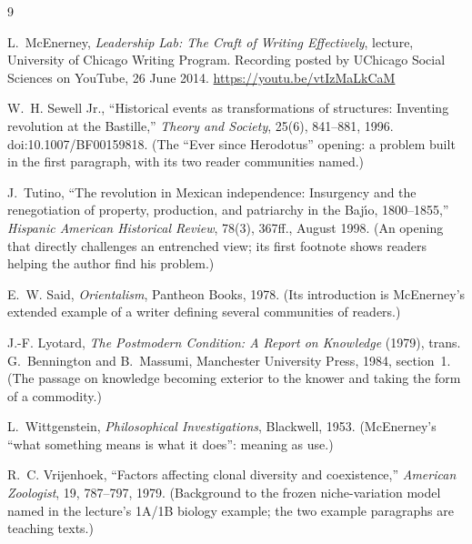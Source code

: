 \documentclass[11pt]{article}
\begin{document}
{\small
\renewcommand{\section}[2]{}%
\begin{thebibliography}{9}\setlength{\itemsep}{0pt}\raggedright

L.~McEnerney, \emph{Leadership Lab: The Craft of Writing Effectively}, lecture, University of Chicago Writing
Program. Recording posted by UChicago Social Sciences on YouTube, 26 June 2014.
\url{https://youtu.be/vtIzMaLkCaM}

W.~H. Sewell Jr., ``Historical events as transformations of structures: Inventing revolution at the Bastille,''
\emph{Theory and Society}, 25(6), 841--881, 1996. doi:10.1007/BF00159818. (The ``Ever since Herodotus''
opening: a problem built in the first paragraph, with its two reader communities named.)

J.~Tutino, ``The revolution in Mexican independence: Insurgency and the renegotiation of property, production,
and patriarchy in the Baj\'{\i}o, 1800--1855,'' \emph{Hispanic American Historical Review}, 78(3), 367ff.,
August 1998. (An opening that directly challenges an entrenched view; its first footnote shows readers
helping the author find his problem.)

E.~W. Said, \emph{Orientalism}, Pantheon Books, 1978. (Its introduction is McEnerney's extended example of a
writer defining several communities of readers.)

J.-F. Lyotard, \emph{The Postmodern Condition: A Report on Knowledge} (1979), trans. G.~Bennington and
B.~Massumi, Manchester University Press, 1984, section~1. (The passage on knowledge becoming exterior to the
knower and taking the form of a commodity.)

L.~Wittgenstein, \emph{Philosophical Investigations}, Blackwell, 1953. (McEnerney's ``what something means is
what it does'': meaning as use.)

R.~C. Vrijenhoek, ``Factors affecting clonal diversity and coexistence,'' \emph{American Zoologist}, 19,
787--797, 1979. (Background to the frozen niche-variation model named in the lecture's 1A/1B biology example;
the two example paragraphs are teaching texts.)


\end{thebibliography}}
\end{document}
